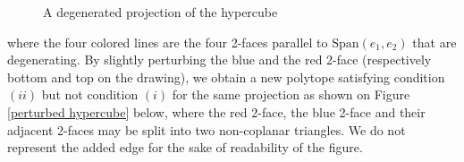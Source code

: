 \documentclass[12pt, notitlepage]{article}
\theoremstyle{plain}
\theoremstyle{definition}
\theoremstyle{plain}
\theoremstyle{remark}
\theoremstyle{plain}
\theoremstyle{plain}
\newcommand{\vect}{\text{Span}}
\begin{document}
\begin{figure}[ht]

    \caption{A degenerated projection of the hypercube}
    \label{hypercube}
\end{figure}

\noindent where the four colored lines are the four 2-faces parallel to $\vect(e_1,e_2)$ that are degenerating. By slightly perturbing the blue and the red 2-face (respectively bottom and top on the drawing), we obtain a new polytope satisfying condition $(ii)$ but not condition $(i)$ for the same projection as shown on Figure \ref{perturbed hypercube} below, where the red 2-face, the blue 2-face and their adjacent 2-faces may be split into two non-coplanar triangles. We do not represent the added edge for the sake of readability of the figure.
\end{document}
